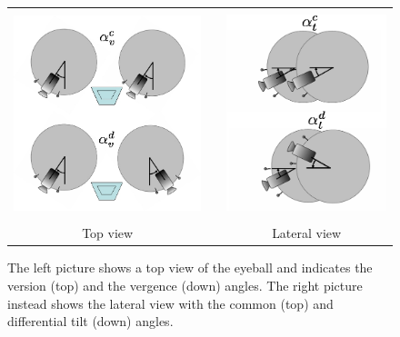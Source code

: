 \begin{figure}
  \begin{center}
  \begin{tabular}{ccc}
  \parbox{60mm}{\includegraphics[height=60mm]{Figure/EyeVergenceVersion.jpg}}  & &
  \parbox{60mm}{\includegraphics[height=60mm]{Figure/EyeCommDiffTilt.jpg}}\\
  Top view & & Lateral view
  \end{tabular}
  \end{center}
  \caption{The left picture shows a top view of the eyeball and indicates the version (top) and the vergence (down) angles. The right picture instead shows the lateral view with the common (top) and differential tilt (down) angles.}\label{Fig:EyeCoordinatedMovements}
 \end{figure}


